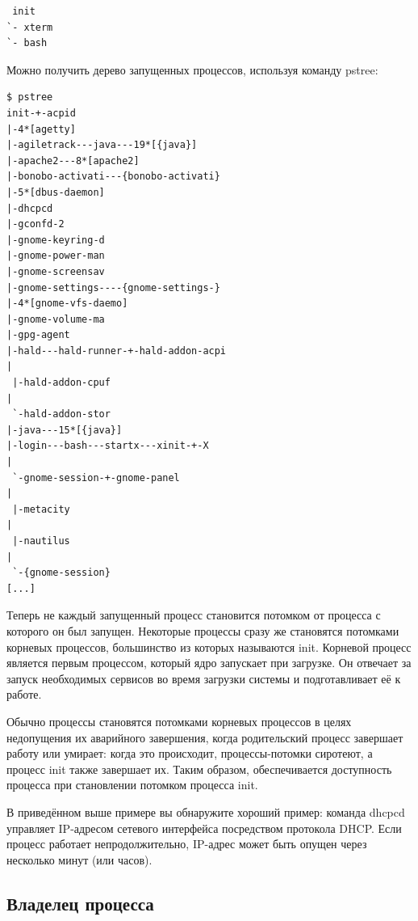 \documentclass[10pt]{book}
\begin{document}
\vspace{3mm}
\begin{tcolorbox}
\begin{lstlisting}
 init
`- xterm
`- bash
\end{lstlisting}
\end{tcolorbox}

Можно получить дерево запущенных процессов, используя команду pstree:

\vspace{3mm}
\begin{tcolorbox}
\begin{lstlisting}
$ pstree
init-+-acpid
|-4*[agetty]
|-agiletrack---java---19*[{java}]
|-apache2---8*[apache2]
|-bonobo-activati---{bonobo-activati}
|-5*[dbus-daemon]
|-dhcpcd
|-gconfd-2
|-gnome-keyring-d
|-gnome-power-man
|-gnome-screensav
|-gnome-settings----{gnome-settings-}
|-4*[gnome-vfs-daemo]
|-gnome-volume-ma
|-gpg-agent
|-hald---hald-runner-+-hald-addon-acpi
|
 |-hald-addon-cpuf
|
 `-hald-addon-stor
|-java---15*[{java}]
|-login---bash---startx---xinit-+-X
|
 `-gnome-session-+-gnome-panel
|
 |-metacity
|
 |-nautilus
|
 `-{gnome-session}
[...]
\end{lstlisting}
\end{tcolorbox}

Теперь не каждый запущенный процесс становится потомком от процесса с которого он был запущен. Некоторые процессы сразу же становятся потомками корневых процессов, большинство из которых называются init. Корневой процесс является первым процессом, который ядро запускает при загрузке. Он отвечает за запуск необходимых сервисов во время загрузки системы и подготавливает её к работе.

Обычно процессы становятся потомками корневых процессов в целях недопущения их аварийного завершения, когда родительский процесс завершает работу или умирает: когда это происходит, процессы-потомки сиротеют, а процесс init также завершает их. Таким образом, обеспечивается доступность процесса при становлении потомком процесса init. 

В приведённом выше примере вы обнаружите хороший пример: команда dhcpcd управляет IP-адресом сетевого интерфейса посредством протокола DHCP. Если процесс работает непродолжительно, IP-адрес может быть опущен через несколько минут (или часов).

\subsection{Владелец процесса}
\end{document}
